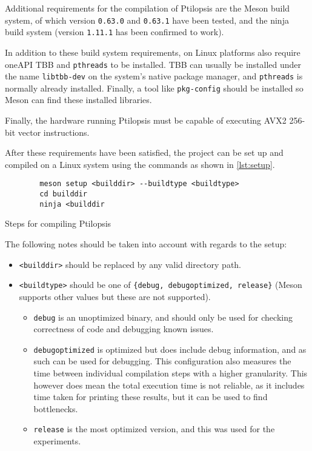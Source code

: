 \documentclass[11pt,dvipsnames]{article}
\newcommand{\mono}[1]{\texttt{#1}}
\begin{document}
Additional requirements for the compilation of Ptilopsis are the Meson build system, of which version \mono{0.63.0} and \mono{0.63.1} have been tested, and the ninja build system (version \mono{1.11.1} has been confirmed to work).

In addition to these build system requirements, on Linux platforms also require oneAPI TBB \cite{oneapi} and \mono{pthreads} to be installed. TBB can usually be installed under the name \mono{libtbb-dev} on the system's native package manager, and \mono{pthreads} is normally already installed. Finally, a tool like \mono{pkg-config} should be installed so Meson can find these installed libraries. 

Finally, the hardware running Ptilopsis must be capable of executing AVX2 256-bit vector instructions.

After these requirements have been satisfied, the project can be set up and compiled on a Linux system using the commands as shown in \autoref{lst:setup}.

\begin{listing}[h]
    \begin{verbatim}
        meson setup <builddir> --buildtype <buildtype>
        cd builddir
        ninja <builddir
    \end{verbatim}
    \caption{Steps for compiling Ptilopsis}
    \label{lst:setup}
\end{listing}

The following notes should be taken into account with regards to the setup:
\begin{itemize}
    \item \mono{<builddir>} should be replaced by any valid directory path.
    \item \mono{<buildtype>} should be one of \mono{\{debug, debugoptimized, release\}} (Meson supports other values but these are not supported).
        \begin{itemize}
            \item \mono{debug} is an unoptimized binary, and should only be used for checking correctness of code and debugging known issues.
            \item \mono{debugoptimized} is optimized but does include debug information, and as such can be used for debugging.
                This configuration also measures the time between individual compilation steps with a higher granularity. This however does mean the total execution time is not reliable, as it includes time taken for printing these results, but it can be used to find bottlenecks.
            \item \mono{release} is the most optimized version, and this was used for the experiments.
        \end{itemize}
\end{itemize}
\end{document}
